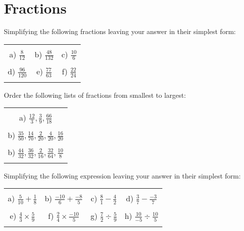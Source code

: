 \documentclass[12pt]{article}
\begin{document}
\section{Fractions}
Simplifying the following fractions leaving your answer in their simplest form:
\begin{table}[h!]
\centering
\begin{tabular}{c c c}
\hspace{2cm} & \hspace{6cm} & \hspace{4cm}\\
a) $\frac{8}{12}$ & b) $\frac{48}{132}$ & c) $\frac{10}{6}$\\ \\
d) $\frac{96}{120}$ & e) $\frac{77}{63}$ & f) $\frac{22}{24}$\\ \\
\end{tabular}
\end{table}
\newline
Order the following lists of fractions from smallest to largest:
\begin{table}[h!]
\centering
\begin{tabular}{c}
\hspace{4cm}\\
a) $\frac{12}{3}, \frac{3}{9}, \frac{66}{18}$\\ \\
b) $\frac{35}{50}, \frac{14}{70}, \frac{2}{20}, \frac{4}{20}, \frac{16}{20}$\\ \\
b) $\frac{44}{32}, \frac{36}{32}, \frac{2}{16}, \frac{32}{64}, \frac{10}{8}$\\ \\
\end{tabular}
\end{table}
\newline
Simplifying the following expression leaving your answer in their simplest form:
\begin{table}[h!]
\centering
\begin{tabular}{c c c c}
\hspace{4cm} & \hspace{4cm} & \hspace{4cm} & \hspace{4cm}\\
a) $\frac{{5}}{{10}} + \frac{{1}}{{8}}$ & b) $\frac{{-10}}{{6}} + \frac{{-8}}{{5}}$ & c) $\frac{{8}}{{1}} - \frac{{4}}{{2}}$ & d) $\frac{{3}}{{7}} - \frac{{-3}}{{7}}$ \\ \\
e) $\frac{{4}}{{3}}\times\frac{{5}}{{9}}$ & f) $\frac{{2}}{{4}}\times\frac{{-10}}{{5}}$ & g) $\frac{{7}}{{2}}\div\frac{{5}}{{9}}$ & h) $\frac{{10}}{{-5}}\div\frac{{10}}{{5}}$ \\ \\
\end{tabular}
\end{table}
\newline
\end{document}
